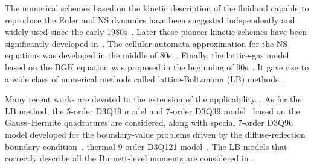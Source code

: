 \documentclass{elsarticle} %
\begin{document}

The numerical schemes based on the kinetic description of the fluidand capable to reproduce the Euler and NS dynamics
have been suggested independently and widely used since the early 1980s~\cite{Potkin1975, Pullin1980, Reitz1981, Aristov1983}.
Later these pioneer kinetic schemes have been significantly developed
in~\cite{Elizarova1985, Deshpande1986, Prendergast1993, Chou1997, Ohwada2004Xu, Ohwada2004Kobayashi, Ohwada2006}.
The cellular-automata approximation for the NS equations was developed in the middle of 80s~\cite{Frisch1986}.
Finally, the lattice-gas model based on the BGK equation was proposed in the beginning of 90s~\cite{Qian1992}.
It gave rise to a wide class of numerical methods called lattice-Boltzmann (LB) methods~\cite{Higuera1989, Benzi1992, Succi2001}.

Many recent works are devoted to the extension of the applicability...
As for the LB method, the 5-order D3Q19 model and 7-order D3Q39 model~\cite{Shan2006}
based on the Gauss--Hermite quadratures are considered, along with special 7-order D3Q96 model
developed for the boundary-value problems driven by the diffuse-reflection boundary condition~\cite{Feuchter2016}.
thermal 9-order D3Q121 model~\cite{Shan2010}.
The LB models that correctly describe all the Burnett-level moments are considered in~\cite{Xu2018, Xu2019}.
\end{document}
